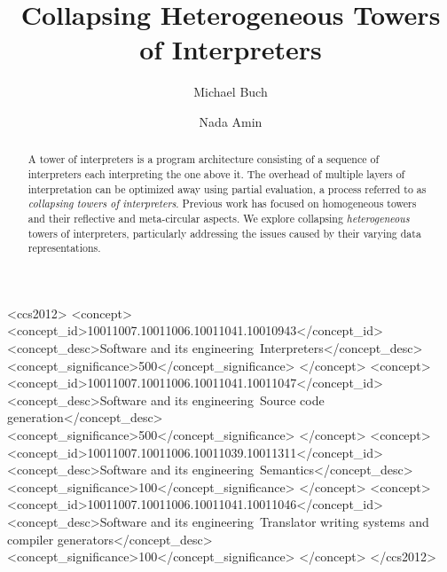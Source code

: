 \documentclass[sigplan,anonymous,review]{acmart}
\theoremstyle{definition}
\begin{document}
\title{Collapsing Heterogeneous Towers of Interpreters}

\author{Michael Buch}

\author{Nada Amin}
\authornotemark[1]

\renewcommand{\shortauthors}{Buch and Amin, et al.}

\begin{abstract}
A tower of interpreters is a program architecture consisting of a sequence of interpreters each interpreting the one above it. The overhead of multiple layers of interpretation can be optimized away using partial evaluation, a process referred to as \textit{collapsing towers of interpreters}.
Previous work has focused on homogeneous towers and their reflective and meta-circular aspects. We explore collapsing \textit{heterogeneous} towers of interpreters, particularly addressing the issues caused by their varying data representations.
\end{abstract}

\begin{CCSXML}
<ccs2012>
<concept>
<concept_id>10011007.10011006.10011041.10010943</concept_id>
<concept_desc>Software and its engineering~Interpreters</concept_desc>
<concept_significance>500</concept_significance>
</concept>
<concept>
<concept_id>10011007.10011006.10011041.10011047</concept_id>
<concept_desc>Software and its engineering~Source code generation</concept_desc>
<concept_significance>500</concept_significance>
</concept>
<concept>
<concept_id>10011007.10011006.10011039.10011311</concept_id>
<concept_desc>Software and its engineering~Semantics</concept_desc>
<concept_significance>100</concept_significance>
</concept>
<concept>
<concept_id>10011007.10011006.10011041.10011046</concept_id>
<concept_desc>Software and its engineering~Translator writing systems and compiler generators</concept_desc>
<concept_significance>100</concept_significance>
</concept>
</ccs2012>
\end{CCSXML}
\end{document}
